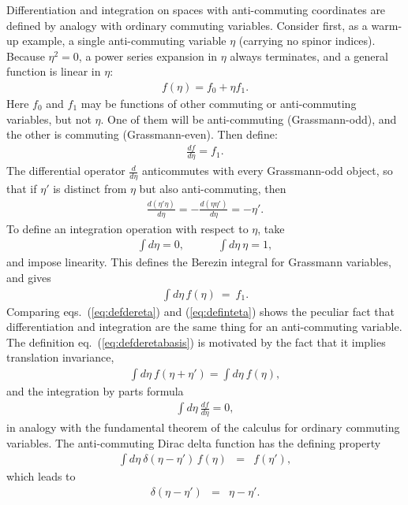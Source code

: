 \documentclass[11pt]{article}
\def\beq{\begin{eqnarray}}
\def\eeq{\end{eqnarray}}
\begin{document}
Differentiation and integration on spaces with anti-commuting coordinates are defined 
by analogy with ordinary commuting variables. Consider first, as a warm-up 
example, a single anti-commuting variable 
$\eta$ (carrying no spinor indices). Because $\eta^2=0$, 
a power series expansion in $\eta$ 
always terminates, and a general function is linear in $\eta$:
\beq
f(\eta) = f_0 + \eta f_1.
\label{eq:deffuneta}
\eeq
Here $f_0$ and $f_1$ may be functions of other commuting or 
anti-commuting variables, but not $\eta$. One of them will be  
anti-commuting (Grassmann-odd), and the other is commuting (Grassmann-even). 
Then define:
\beq
\frac{df}{d\eta} = f_1 .
\label{eq:defdereta}
\eeq
The differential operator $\frac{d}{d\eta}$ anticommutes 
with every Grassmann-odd object,
so that if $\eta'$ is distinct from $\eta$ but also anti-commuting, then 
\beq
\frac{d(\eta'\eta)}{d\eta} = -\frac{d(\eta\eta')}{d\eta} = -\eta'.
\eeq
To define an integration operation with respect to $\eta$, take
\beq
\int d\eta = 0, \qquad\quad
\int d\eta\> \eta = 1,
\label{eq:defderetabasis}
\eeq
and impose linearity.
This defines the Berezin integral \cite{Berezin} 
for Grassmann variables, and gives
\beq
\int d\eta \,f(\eta)  
\> = \> f_1 .
\label{eq:definteta}
\eeq
Comparing eqs.~(\ref{eq:defdereta}) and (\ref{eq:definteta}) shows
the peculiar fact that 
differentiation and integration are the same thing
for an anti-commuting variable. 
The definition eq.~(\ref{eq:defderetabasis}) is motivated by the fact that it implies
translation invariance,
\beq
\int d\eta \> f(\eta + \eta') = \int d\eta \> f(\eta),
\eeq
and the integration by parts formula
\beq
\int d\eta \> \frac{df}{d\eta} = 0,
\label{eq:funtheoeta}
\eeq
in analogy with the fundamental theorem of the calculus 
for ordinary commuting variables. 
The anti-commuting Dirac delta function has the defining property
\beq
\int d\eta\> \delta(\eta - \eta')\, f(\eta) &=& f(\eta'),
\eeq
which leads to
\beq
\delta (\eta - \eta') &=& \eta - \eta'.
\eeq
\end{document}
